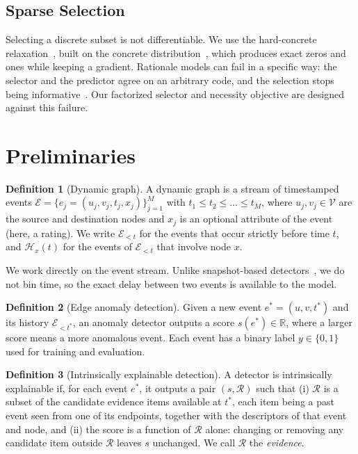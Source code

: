 \documentclass[pdflatex,sn-basic]{sn-jnl}
\newcommand{\Ecal}{\mathcal{E}}
\newcommand{\Vcal}{\mathcal{V}}
\newcommand{\Hcal}{\mathcal{H}}
\newcommand{\Rcal}{\mathcal{R}}
\newcommand{\R}{\mathbb{R}}
\theoremstyle{definition}
\newtheorem{definition}{Definition}
\theoremstyle{plain}
\begin{document}
\subsection{Sparse Selection}
Selecting a discrete subset is not differentiable. We use the hard-concrete
relaxation~\cite{l0}, built on the concrete
distribution~\cite{concrete,gumbel}, which produces exact zeros and ones while
keeping a gradient. Rationale models can fail in a specific way: the selector
and the predictor agree on an arbitrary code, and the selection stops being
informative~\cite{interlocking}. Our factorized selector and necessity
objective are designed against this failure.

\section{Preliminaries}
\label{sec:prelim}

\begin{definition}[Dynamic graph]
A dynamic graph is a stream of timestamped events
$\Ecal=\{e_j=(u_j,v_j,t_j,x_j)\}_{j=1}^{M}$ with $t_1\le t_2\le\dots\le t_M$,
where $u_j,v_j\in\Vcal$ are the source and destination nodes and $x_j$ is an
optional attribute of the event (here, a rating). We write $\Ecal_{<t}$ for
the events that occur strictly before time $t$, and $\Hcal_x(t)$ for the events
of $\Ecal_{<t}$ that involve node $x$.
\end{definition}

We work directly on the event stream. Unlike snapshot-based
detectors~\cite{strgnn,taddy}, we do not bin time, so the exact delay between
two events is available to the model.

\begin{definition}[Edge anomaly detection]
Given a new event $e^\ast=(u,v,t^\ast)$ and its history $\Ecal_{<t^\ast}$, an
anomaly detector outputs a score $s(e^\ast)\in\R$, where a larger score means
a more anomalous event. Each event has a binary label $y\in\{0,1\}$ used for
training and evaluation.
\end{definition}

\begin{definition}[Intrinsically explainable detection]
\label{def:exp}
A detector is intrinsically explainable if, for each event $e^\ast$, it outputs a
pair $(s,\Rcal)$ such that (i) $\Rcal$ is a subset of the candidate evidence
items available at $t^\ast$, each item being a past event seen from one of its
endpoints, together with the descriptors of that event and node, and (ii) the
score is a function of $\Rcal$ alone: changing or removing any candidate item
outside $\Rcal$ leaves $s$ unchanged. We call $\Rcal$ the \emph{evidence}.
\end{definition}
\end{document}
